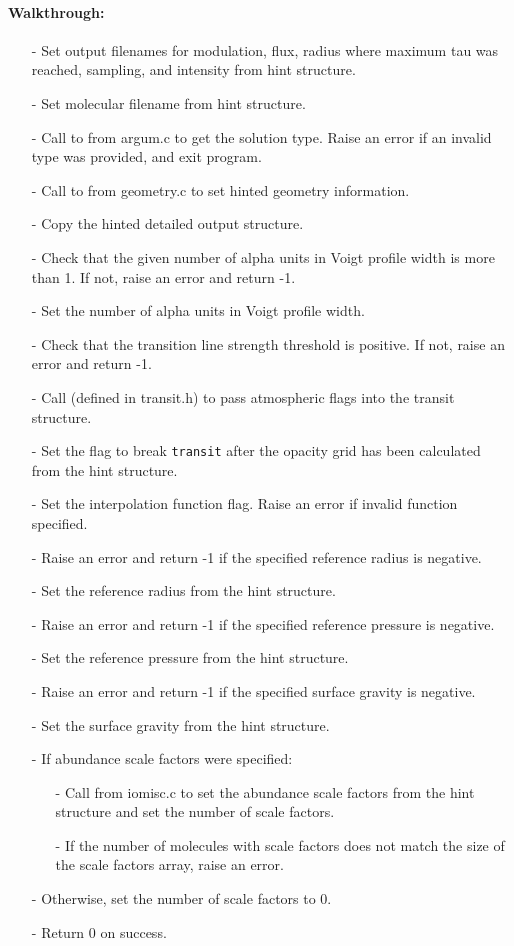 \documentclass[letterpaper,12pt]{article}
\begin{document}
\paragraph{Walkthrough:}
\begin{enumerate}[leftmargin=10pt, noitemsep, parsep=0pt, topsep=0ex]
\item[-] Set output filenames for modulation, flux, radius where maximum tau was reached, sampling, and intensity from hint structure.
\item[-] Set molecular filename from hint structure.
\item[-] Call to  from argum.c to get the solution type. Raise an error if an invalid type was provided, and exit program.
\item[-] Call to  from geometry.c to set hinted geometry information.
\item[-] Copy the hinted detailed output structure.
\item[-] Check that the given number of alpha units in Voigt profile width is more than 1. If not, raise an error and return -1.
\item[-] Set the number of alpha units in Voigt profile width.
\item[-] Check that the transition line strength threshold is positive. If not, raise an error and return -1.
\item[-] Call  (defined in transit.h) to pass atmospheric flags into the transit structure.
\item[-] Set the flag to break {\tt transit} after the opacity grid has been calculated from the hint structure.
\item[-] Set the interpolation function flag. Raise an error if invalid function specified.
\item[-] Raise an error and return -1 if the specified reference radius is negative.
\item[-] Set the reference radius from the hint structure.
\item[-] Raise an error and return -1 if the specified reference pressure is negative.
\item[-] Set the reference pressure from the hint structure.
\item[-] Raise an error and return -1 if the specified surface gravity is negative.
\item[-] Set the surface gravity from the hint structure.
\item[-] If abundance scale factors were specified:
\begin{enumerate}[leftmargin=10pt, noitemsep, parsep=0pt, topsep=0ex]
\item[-] Call  from iomisc.c to set the abundance scale factors from the hint structure and set the number of scale factors.
\item[-] If the number of molecules with scale factors does not match the size of the scale factors array, raise an error.
\end{enumerate}
\item[-] Otherwise, set the number of scale factors to 0.
\item[-] Return 0 on success.
\end{enumerate}
\end{document}
